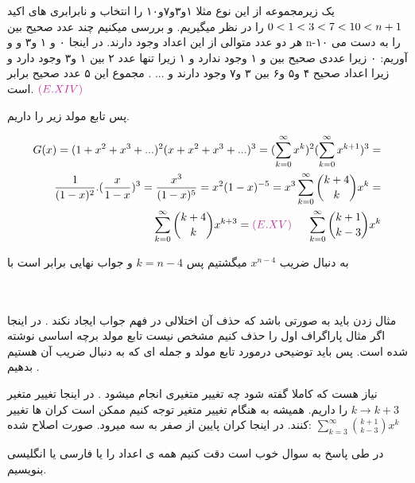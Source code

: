 \documentclass[11pt,largemargins]{h2wp}
\begin{document}
\solution
یک زیرمجموعه از این نوع مثلا {۱و۳و۷و۱۰} را انتخاب و نابرابری های اکید 
    $ \\ 0 < 1 < 3 < 7 < 10 < n+1 \\ $ 
   را در نظر میگیریم. و بررسی میکنیم چند عدد صحیح بین هر دو عدد متوالی از این اعداد وجود دارند. در اینجا ۰ و ۱ و۳ و
    و n-۱۰ 
   را به دست می آوریم: ۰ زیرا عددی صحیح بین
   و ۱ وجود ندارد و ۱ زیرا تنها عدد ۲ بین ۱ و۳ وجود دارد و
   زیرا اعداد صحیح ۴ و۵ و۶ بین ۳ و۷ وجود دارند و ... .
   مجموع این ۵ عدد صحیح برابر
     است.
     $ {\textcolor{byzantine}{(E.XIV)}}  $
     
    پس تابع مولد زیر را داریم.
    
   \begin{align*}
   G(x) = ( 1 + x^2 + x^3 + ...)^2 (x + x^2 + x^3 + ...)^3 = ( \sum_{k = 0}^{\infty} x^k)^2 ( \sum_{k = 0}^{\infty} x^{k+1})^3 =\\ \frac{1}{(1-x)^2} . (\frac{x}{1-x})^3 = \frac{x^3 }{(1-x)^5} = x^2 (1-x)^{-5} = x^3 \sum_{k=0}^{\infty} \binom{k+4}{k} x ^ k =\\ \sum_{k=0}^{\infty} \binom{k+4}{k} x^{k+3} = {\textcolor{byzantine}{(E.XV)}} \hspace{0.5 cm} \sum_{k=0}^{\infty}\binom{k+1}{k-3} x^k
\end{align*}    
      
      به دنبال ضریب
      $ x ^ {n-4 } $
      میگشتیم پس 
      $ k = n-4 $
      و جواب نهایی برابر است با
       \\ \\ \\ 
  
 
      
\notes

  مثال زدن باید به صورتی باشد که حذف آن اختلالی در فهم جواب ایجاد نکند . در اینجا اگر مثال پاراگراف اول را حذف کنیم مشخص نیست تابع مولد برچه اساسی نوشته شده است. پس باید توضیحی درمورد تابع مولد و جمله ای که به دنبال ضریب آن هستیم بدهیم .
		
     نیاز هست که کاملا گفته شود چه تغییر متغیری انجام میشود . در اینجا تغییر متغیر $ k \rightarrow {k+3} $   را داریم.  همیشه به هنگام تغییر متغیر توجه کنیم ممکن است کران ها تغییر کنند. در اینجا کران پایین از صفر به سه میرود. 
	 صورت اصلاح شده:
	 $ \sum_{k=3}^{\infty}\binom{k+1}{k-3} x^k $
	
	  در طی پاسخ به سوال خوب است دقت کنیم همه ی اعداد را یا فارسی یا انگلیسی 
	  بنویسیم.
	  
\end{document}
